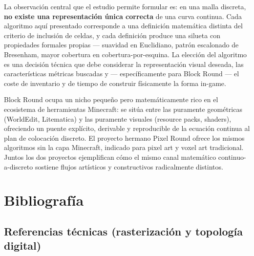 \documentclass[12pt,a4paper]{scrartcl}
\newcommand{\acc}[1]{\textcolor{accent}{\textbf{#1}}}
\begin{document}
La observación central que el estudio permite formular es: en una malla discreta, \acc{no existe una representación única correcta} de una curva continua. Cada algoritmo aquí presentado corresponde a una definición matemática distinta del criterio de inclusión de celdas, y cada definición produce una silueta con propiedades formales propias --- suavidad en Euclidiano, patrón escalonado de Bresenham, mayor cobertura en cobertura-por-esquina. La elección del algoritmo es una decisión técnica que debe considerar la representación visual deseada, las características métricas buscadas y --- específicamente para Block Round --- el coste de inventario y de tiempo de construir físicamente la forma in-game.

Block Round ocupa un nicho pequeño pero matemáticamente rico en el ecosistema de herramientas Minecraft: se sitúa entre las puramente geométricas (WorldEdit, Litematica) y las puramente visuales (resource packs, shaders), ofreciendo un puente explícito, derivable y reproducible de la ecuación continua al plan de colocación discreto. El proyecto hermano Pixel Round ofrece los mismos algoritmos sin la capa Minecraft, indicado para pixel art y voxel art tradicional. Juntos los dos proyectos ejemplifican cómo el mismo canal matemático continuo-a-discreto sostiene flujos artísticos y constructivos radicalmente distintos.

\section*{\color{accent}Bibliografía}
\label{sec:bib}

\subsection*{Referencias técnicas (rasterización y topología digital)}
\end{document}

